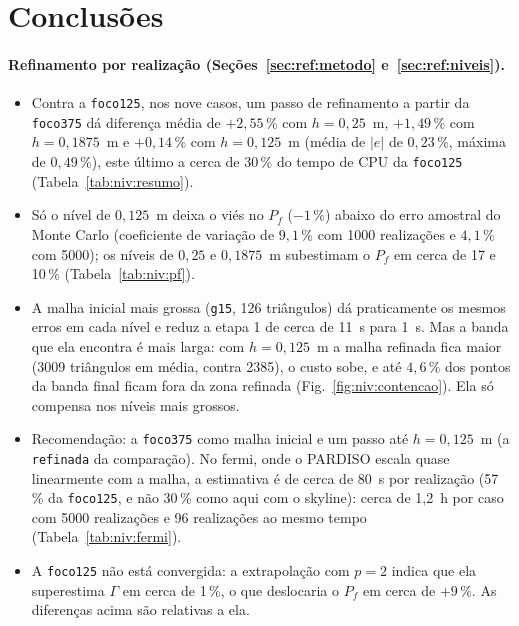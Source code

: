 \section{Conclusões}\label{sec:conclusoes}

\paragraph{Refinamento por realização (Seções~\ref{sec:ref:metodo} e~\ref{sec:ref:niveis}).}
\begin{itemize}
\item Contra a \texttt{foco125}, nos nove casos, um passo de refinamento a partir da \texttt{foco375} dá diferença média
  de $+2{,}55\,\%$ com $h = 0{,}25$~m, $+1{,}49\,\%$ com $h = 0{,}1875$~m e $+0{,}14\,\%$ com $h = 0{,}125$~m (média de
  $|e|$ de $0{,}23\,\%$, máxima de $0{,}49\,\%$), este último a cerca de 30\,\% do tempo de CPU da \texttt{foco125}
  (Tabela~\ref{tab:niv:resumo}).
\item Só o nível de $0{,}125$~m deixa o viés no $P_f$ ($-1\,\%$) abaixo do erro amostral do Monte Carlo (coeficiente
  de variação de $9{,}1\,\%$ com 1000 realizações e $4{,}1\,\%$ com 5000); os níveis de $0{,}25$ e $0{,}1875$~m
  subestimam o $P_f$ em cerca de 17 e 10\,\% (Tabela~\ref{tab:niv:pf}).
\item A malha inicial mais grossa (\texttt{g15}, 126 triângulos) dá praticamente os mesmos erros em cada nível e reduz a
  etapa 1 de cerca de 11~s para 1~s. Mas a banda que ela encontra é mais larga: com $h = 0{,}125$~m a malha refinada
  fica maior (3009 triângulos em média, contra 2385), o custo sobe, e até $4{,}6\,\%$ dos pontos da banda final ficam
  fora da zona refinada (Fig.~\ref{fig:niv:contencao}). Ela só compensa nos níveis mais grossos.
\item Recomendação: a \texttt{foco375} como malha inicial e um passo até $h = 0{,}125$~m (a \texttt{refinada} da
  comparação). No fermi, onde o PARDISO escala quase linearmente com a malha, a estimativa é de cerca de 80~s por
  realização (57\,\% da \texttt{foco125}, e não 30\,\% como aqui com o skyline): cerca de 1,2~h por caso com 5000
  realizações e 96 realizações ao mesmo tempo (Tabela~\ref{tab:niv:fermi}).
\item A \texttt{foco125} não está convergida: a extrapolação com $p = 2$ indica que ela superestima $\Gamma$ em cerca
  de 1\,\%, o que deslocaria o $P_f$ em cerca de $+9\,\%$. As diferenças acima são relativas a ela.
\end{itemize}


